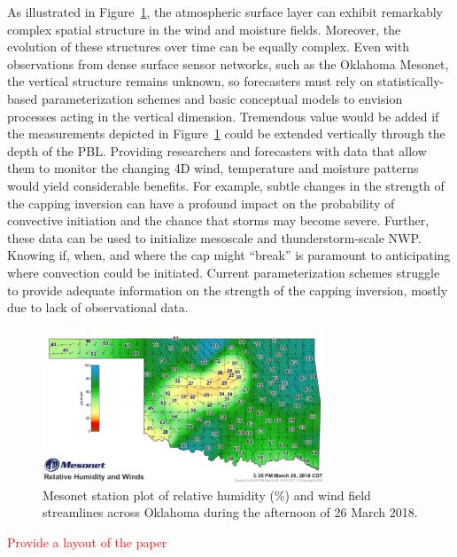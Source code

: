 \documentclass[sensors,review,submit,moreauthors,pdftex,10pt,a4paper]{mdpi}
\theoremstyle{mdpi}
\newcounter{ex}
\newcounter{re}
\theoremstyle{mdpidefinition}
\begin{document}
As illustrated in Figure~\ref{fig:OKMesoExample}, the atmospheric surface layer can exhibit remarkably complex spatial structure in the wind and moisture fields. Moreover, the evolution of these structures over time can be equally complex. Even with observations from dense surface sensor networks, such as the Oklahoma Mesonet, the vertical structure remains unknown, so forecasters must rely on statistically-based parameterization schemes \citep{teixeira++2008_BAMS} and basic conceptual models to envision processes acting in the vertical dimension. Tremendous value would be added if the measurements depicted in Figure~\ref{fig:OKMesoExample} could be extended vertically through the depth of the PBL. Providing researchers and forecasters with data that allow them to monitor the changing 4D wind, temperature and moisture patterns would yield considerable benefits. For example, subtle changes in the strength of the capping inversion can have a profound impact on the probability of convective initiation and the chance that storms may become severe. Further, these data can be used to initialize mesoscale and thunderstorm-scale NWP. Knowing if, when, and where the cap might ``break'' is paramount to anticipating where convection could be initiated. Current parameterization schemes struggle to provide adequate information on the strength of the capping inversion, mostly due to lack of observational data.

\begin{figure}
\centering
\includegraphics[angle=0, width=0.75\textwidth]{figures/OKMesoExample.pdf}
\caption{\label{fig:OKMesoExample} Mesonet station plot of relative humidity (\%) and wind field streamlines across Oklahoma during the afternoon of 26 March 2018.}
\end{figure}

\textcolor{red}{Provide a layout of the paper}
\end{document}
